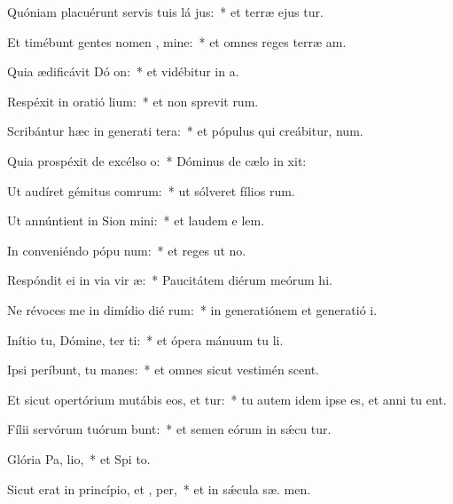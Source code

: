 \item Quóniam placuérunt servis tuis lá jus:~* et terræ ejus tur.
\item Et timébunt gentes nomen , mine:~* et omnes reges terræ  am.
\item Quia ædificávit Dó on:~* et vidébitur in  a.
\item Respéxit in oratió lium:~* et non sprevit  rum.
\item Scribántur hæc in generati tera:~* et pópulus qui creábitur,  num.
\item Quia prospéxit de excélso  o:~* Dóminus de cælo in  xit:
\item Ut audíret gémitus comrum:~* ut sólveret fílios rum.
\item Ut annúntient in Sion  mini:~* et laudem e  lem.
\item In conveniéndo pópu  num:~* et reges ut  no.
\item Respóndit ei in via vir æ:~* Paucitátem diérum meórum  hi.
\item Ne révoces me in dimídio dié rum:~* in generatiónem et generatió  i.
\item Inítio tu, Dómine, ter ti:~* et ópera mánuum tu  li.
\item Ipsi períbunt, tu  manes:~* et omnes sicut vestimén scent.
\item Et sicut opertórium mutábis eos, et tur:~* tu autem idem ipse es, et anni tu  ent.
\item Fílii servórum tuórum bunt:~* et semen eórum in sǽcu tur.
\item Glória Pa,  lio,~* et Spi to.
\item Sicut erat in princípio, et ,  per,~* et in sǽcula sæ. men.
